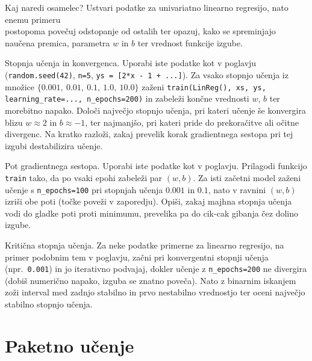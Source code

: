 \begin{exercise}{Kaj naredi osamelec?}
Ustvari podatke za univariatno linearno regresijo, nato enemu primeru\\
postopoma povečuj odstopanje od ostalih ter opazuj, kako se spreminjajo\\
naučena premica, parametra $w$ in $b$ ter vrednost funkcije izgube.
\end{exercise}

\begin{exercise}{Stopnja učenja in konvergenca.}
Uporabi iste podatke kot v poglavju (\texttt{random.seed(42)}, \texttt{n=5}, \texttt{ys = [2*x - 1 + ...]}). Za vsako stopnjo učenja iz množice $\{0.001,\ 0.01,\ 0.1,\ 1.0,\ 10.0\}$ zaženi \texttt{train(LinReg(), xs, ys, learning\_rate=..., n\_epochs=200)} in zabeleži končne vrednosti $w$, $b$ ter morebitno napako. Določi največjo stopnjo učenja, pri kateri učenje še konvergira blizu $w \approx 2$ in $b \approx -1$, ter najmanjšo, pri kateri pride do prekoračitve ali očitne divergenc. Na kratko razloži, zakaj prevelik korak gradientnega sestopa pri tej izgubi destabilizira učenje.
\end{exercise}

\begin{exercise}{Pot gradientnega sestopa.}
Uporabi iste podatke kot v poglavju. Prilagodi funkcijo \texttt{train} tako, da po vsaki epohi zabeleži par $(w, b)$. Za isti začetni model zaženi učenje s \texttt{n\_epochs=100} pri stopnjah učenja $0.001$ in $0.1$, nato v ravnini $(w, b)$ izriši obe poti (točke poveži v zaporedju). Opiši, zakaj majhna stopnja učenja vodi do gladke poti proti minimumu, prevelika pa do cik-cak gibanja čez dolino izgube.
\end{exercise}

\begin{exercise}{Kritična stopnja učenja.}
Za neke podatke primerne za linearno regresijo, na primer podobnim tem v poglavju, začni pri konvergentni stopnji učenja (npr.\ \texttt{0.001}) in jo iterativno podvajaj, dokler učenje z \texttt{n\_epochs=200} ne divergira (dobiš numerično napako, izguba se znatno poveča). Nato z binarnim iskanjem zoži interval med zadnjo stabilno in prvo nestabilno vrednostjo ter oceni največjo stabilno stopnjo učenja.
\end{exercise}

\section{Paketno učenje}


